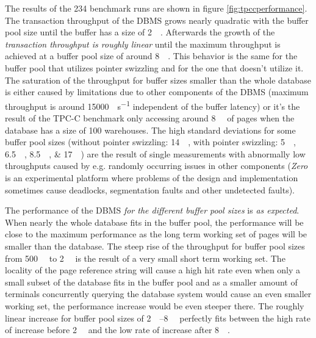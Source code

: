     The results of the \num{234} benchmark runs are shown in figure \ref{fig:tpccperformance}. The transaction throughput of the DBMS grows nearly quadratic with the buffer pool size until the buffer has a size of \SI{2}{\gibi\byte}. Afterwards the growth of the \emph{transaction throughput is roughly linear} until the maximum throughput is achieved at a buffer pool size of around \SI{8}{\gibi\byte}. This behavior is the same for the buffer pool that utilizes pointer swizzling and for the one that doesn't utilize it. The saturation of the throughput for buffer sizes smaller than the whole database is either caused by limitations due to other components of the DBMS (maximum throughput is around \SI{15000}{\transactions\per\second} independent of the buffer latency) or it's the result of the TPC-C benchmark only accessing around \SI{8}{\gibi\byte} of pages when the database has a size of 100 warehouses. The high standard deviations for some buffer pool sizes (without pointer swizzling: \SI{14}{\gibi\byte}, with pointer swizzling: \SIlist{5; 6.5; 8.5; 17}{\gibi\byte}) are the result of single measurements with abnormally low throughputs caused by e.g. randomly occurring issues in other components (\emph{Zero} is an experimental platform where problems of the design and implementation sometimes cause deadlocks, segmentation faults and other undetected faults).

    The performance of the DBMS \emph{for the different buffer pool sizes} is \emph{as expected}. When nearly the whole database fits in the buffer pool, the performance will be close to the maximum performance as the long term working set of pages will be smaller than the database. The steep rise of the throughput for buffer pool sizes from \SI{500}{\mebi\byte} to \SI{2}{\gibi\byte} is the result of a very small short term working set. The locality of the page reference string will cause a high hit rate even when only a small subset of the database fits in the buffer pool and as a smaller amount of terminals concurrently querying the database system would cause an even smaller working set, the performance increase would be even steeper there. The roughly linear increase for buffer pool sizes of \SIrange{2}{8}{\gibi\byte} perfectly fits between the high rate of increase before \SI{2}{\gibi\byte} and the low rate of increase after \SI{8}{\gibi\byte}.

